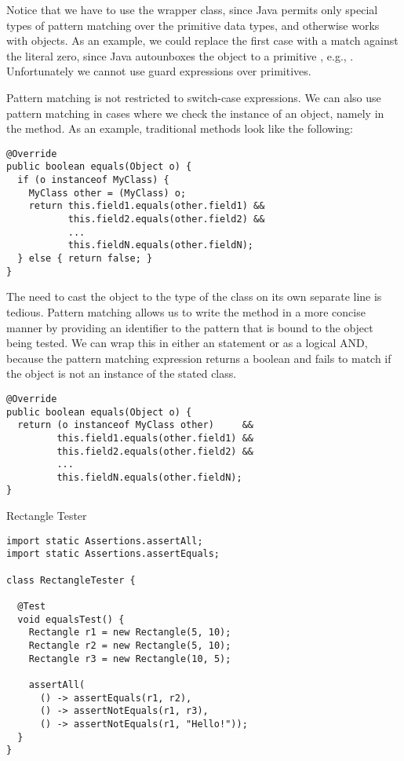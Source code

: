 Notice that we have to use the wrapper class, since Java permits only special types of pattern matching over the primitive data types, and otherwise works with objects. As an example, we could replace the first case with a match against the literal zero, since Java autounboxes the  object to a primitive , e.g., . Unfortunately we cannot use guard expressions over primitives.

Pattern matching is not restricted to switch-case expressions. We can also use pattern matching in cases where we check the instance of an object, namely in the  method. As an example, traditional  methods look like the following:

\par{
\begin{verbatim}
@Override
public boolean equals(Object o) {
  if (o instanceof MyClass) {
    MyClass other = (MyClass) o;
    return this.field1.equals(other.field1) &&
           this.field2.equals(other.field2) &&
           ...
           this.fieldN.equals(other.fieldN);
  } else { return false; }
}
\end{verbatim}
}

The need to cast the object to the type of the class on its own separate line is tedious. Pattern matching allows us to write the  method in a more concise manner by providing an identifier to the pattern that is bound to the object being tested. We can wrap this in either an  statement or as a logical AND, because the pattern matching expression returns a boolean and fails to match if the object is not an instance of the stated class.

\par{
\begin{verbatim}
@Override
public boolean equals(Object o) {
  return (o instanceof MyClass other)     &&
         this.field1.equals(other.field1) &&
         this.field2.equals(other.field2) &&
         ...
         this.fieldN.equals(other.fieldN);
}
\end{verbatim}
}


\begin{cl}[]{Rectangle Tester}
\begin{lstlisting}[language=MyJava]
import static Assertions.assertAll;
import static Assertions.assertEquals;

class RectangleTester {

  @Test
  void equalsTest() {
    Rectangle r1 = new Rectangle(5, 10);
    Rectangle r2 = new Rectangle(5, 10);
    Rectangle r3 = new Rectangle(10, 5);

    assertAll(
      () -> assertEquals(r1, r2),
      () -> assertNotEquals(r1, r3),
      () -> assertNotEquals(r1, "Hello!"));
  }
}
\end{lstlisting}
\end{cl}

